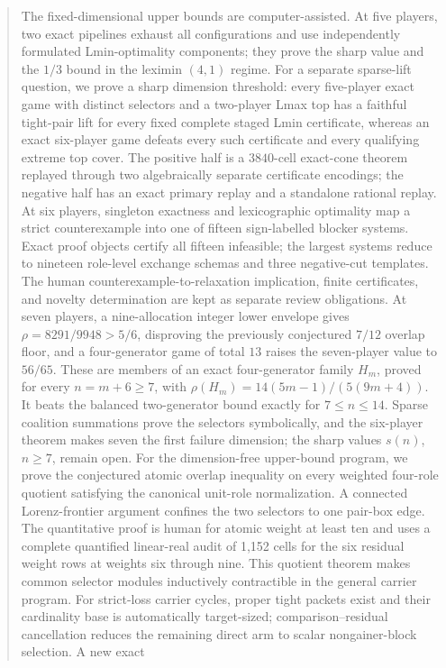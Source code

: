 \documentclass[11pt]{article}
\begin{document}
\begin{abstract}
The fixed-dimensional upper bounds are computer-assisted.  At five players,
two exact pipelines exhaust all configurations and use independently
formulated Lmin-optimality components; they prove the sharp value and the
$1/3$ bound
in the leximin $(4,1)$ regime.
For a separate sparse-lift question, we prove a sharp dimension threshold:
every five-player exact game with distinct selectors and a two-player Lmax
top has a faithful tight-pair lift for every fixed complete staged Lmin certificate, whereas an
exact six-player game defeats every such certificate and every qualifying
extreme top cover.  The positive half is a $3840$-cell exact-cone theorem
replayed through two algebraically separate certificate encodings; the
negative half has an exact primary replay and a standalone rational replay.
At six players, singleton exactness and lexicographic optimality map a strict
counterexample into one of fifteen sign-labelled blocker systems.  Exact
proof objects certify all fifteen infeasible; the largest systems reduce to
nineteen role-level exchange schemas and three negative-cut templates.  The
human counterexample-to-relaxation implication, finite certificates, and
novelty determination are kept as separate review obligations.
At seven players, a nine-allocation integer lower envelope gives
\(\rho=8291/9948>5/6\), disproving the previously conjectured
\(7/12\) overlap floor, and a four-generator game of total \(13\) raises the
seven-player value to \(56/65\).  These are members of an exact
four-generator family \(H_m\), proved for every \(n=m+6\ge7\), with
\(\rho(H_m)=14(5m-1)/(5(9m+4))\).  It beats the balanced two-generator
bound exactly for \(7\le n\le14\).  Sparse coalition summations prove the
selectors symbolically, and the six-player theorem
makes seven the first failure dimension; the sharp values \(s(n)\),
\(n\ge7\), remain open.
For the dimension-free upper-bound program, we prove the conjectured atomic
overlap inequality on every weighted four-role quotient satisfying the
canonical unit-role normalization.  A connected Lorenz-frontier argument
confines the two selectors to one pair-box edge.  The quantitative proof is
human for atomic weight at least ten and uses a complete quantified
linear-real audit of 1,152 cells for the six residual weight rows at weights
six through nine.  This quotient theorem makes common selector modules
inductively contractible in the general carrier program.  For strict-loss
carrier cycles, proper tight packets exist and their cardinality base is
automatically target-sized; comparison--residual cancellation reduces the
remaining direct arm to scalar nongainer-block selection.  A new exact

\end{abstract}
\end{document}

